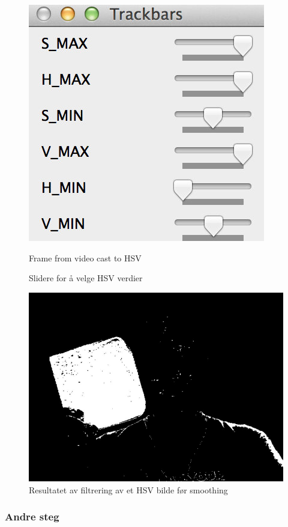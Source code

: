 \begin{figure}[h!]
	\centering
	\includegraphics[scale=0.45]{img/sliders.jpg}
	\caption[First iteration HSV image]{Frame from video cast to HSV}
	\caption{Slidere for å velge HSV verdier}
	\label{fig:sliders}
\end{figure}

\begin{figure}[h!]
	\centering
	\includegraphics[scale=0.45]{img/first-binary.jpg}
	\caption[Første iterasjon binært bilde]{Resultatet av filtrering av et HSV bilde før smoothing}
	\label{fig:firstiterationbinary}
\end{figure}

\subsubsection{Andre steg}

